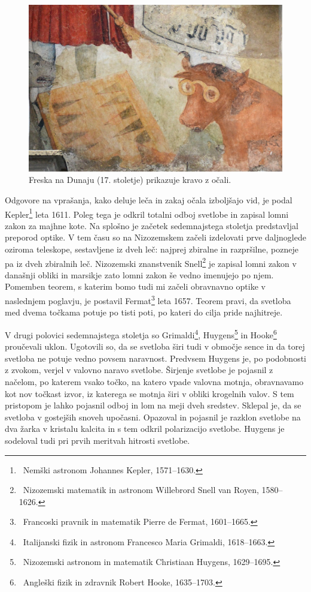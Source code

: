 \begin{figure}[ht]
\centering
\includegraphics[width=85truemm]{slike/01_Dunaj.jpg}
\caption{Freska na Dunaju (17. stoletje) prikazuje kravo z očali.}
\label{fig:01_Dunaj}
\end{figure}

Odgovore na vprašanja, kako deluje leča in zakaj očala izboljšajo vid, je podal
Kepler\footnote{~Nemški astronom Johannes Kepler, 1571--1630.} leta 1611.
Poleg tega je odkril totalni odboj svetlobe in zapisal lomni zakon za majhne kote.
Na splošno je začetek sedemnajstega stoletja predstavljal preporod optike. 
V tem času so na Nizozemskem začeli izdelovati prve daljnoglede oziroma
teleskope, sestavljene iz dveh leč:
najprej zbiralne in razpršilne, pozneje pa iz dveh zbiralnih leč. 
Nizozemski znanstvenik Snell\footnote{~Nizozemski matematik in astronom Willebrord 
Snell van Royen, 1580--1626.} je zapisal lomni zakon v današnji obliki in
marsikje zato lomni zakon še vedno imenujejo po njem. Pomemben teorem, s katerim
bomo tudi mi začeli obravnavno optike v naslednjem poglavju, je postavil 
Fermat\footnote{~Francoski pravnik in matematik Pierre de Fermat, 1601--1665.}
leta 1657. Teorem pravi, da svetloba med dvema točkama potuje po tisti poti, 
po kateri do cilja pride najhitreje.

V drugi polovici sedemnajstega stoletja so Grimaldi\footnote{~Italijanski
fizik in astronom Francesco Maria Grimaldi, 1618--1663.}, Huygens\footnote{~Nizozemski
astronom in matematik Christiaan Huygens, 1629--1695.} in Hooke\footnote{~Angleški
fizik in zdravnik Robert Hooke, 1635--1703.} proučevali uklon. Ugotovili so, da se 
svetloba širi tudi v območje sence in da torej svetloba ne potuje vedno 
povsem naravnost. Predvsem Huygens je, po podobnosti z zvokom, verjel v 
valovno naravo svetlobe. Širjenje svetlobe je pojasnil z načelom, 
po katerem vsako točko, na katero vpade valovna motnja, obravnavamo 
kot nov točkast izvor, iz katerega se motnja širi v obliki krogelnih valov. 
S tem pristopom je lahko pojasnil odboj in lom na meji dveh sredstev. Sklepal je, da
se svetloba v gostejših snoveh upočasni.
Opazoval in pojasnil je razklon svetlobe na dva žarka v kristalu kalcita 
in s tem odkril polarizacijo svetlobe. Huygens je sodeloval tudi pri 
prvih meritvah hitrosti svetlobe. 

